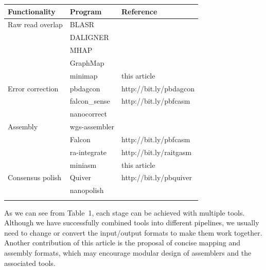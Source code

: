 \documentclass{bioinfo}
\begin{document}
\begin{table}[b]
{\footnotesize
\begin{tabular}{p{2.4cm}p{2cm}l}
\toprule
Functionality & Program & Reference \\
\midrule
Raw read overlap & BLASR & \citet{Chaisson:2012aa}\\
& DALIGNER & \citet{DBLP:conf/wabi/Myers14} \\
& MHAP & \citet{Berlin:2015xy} \\
& GraphMap & \citet{sovic:2015aa} \\
& minimap & this article \\
Error correction & pbdagcon & http://bit.ly/pbdagcon \\
& falcon\_sense & http://bit.ly/pbfcasm \\
& nanocorrect & \citet{Loman:2015xu} \\
Assembly & wgs-assembler & \citet{Myers:2000kl} \\
& Falcon & http://bit.ly/pbfcasm \\
& ra-integrate & http://bit.ly/raitgasm \\
& miniasm & this article \\
Consensus polish & Quiver & http://bit.ly/pbquiver \\
& nanopolish & \citet{Loman:2015xu} \\
\botrule
\end{tabular}
}{}
\end{table}

As we can see from Table~1, each stage can be achieved with multiple tools.
Although we have successfully combined tools into different pipelines, we
usually need to change or convert the input/output formats to make them work
together. Another contribution of this article is the proposal of concise
mapping and assembly formats, which may encourage modular design of assemblers
and the associated tools.
\end{document}
